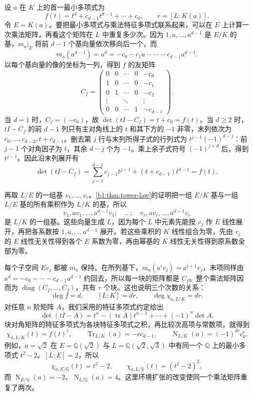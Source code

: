 设 \(a\) 在 \(K\) 上的首一最小多项式为
\[
	f(t)=t^d+c_{d-1}t^{d-1}+\cdots+c_0, \qquad r=[L:K(a)].
\]
令 \(E=K(a)\)。要把最小多项式与乘法特征多项式联系起来，可以在 \(E\) 上计算一次乘法矩阵，再看这个矩阵在 \(L\) 中重复多少次。因为 \(1,a,\ldots,a^{d-1}\) 是 \(E/K\) 的基，\(m_a|_E\) 将前 \(d-1\) 个基向量依次移向后一个，而
\[
	m_a(a^{d-1})=a^d=-c_0-c_1a-\cdots-c_{d-1}a^{d-1}.
\]
以每个基向量的像的坐标为一列，得到 \(f\) 的友矩阵
\[
	C_f=\begin{pmatrix}
		0&0&\cdots&0&-c_0\\
		1&0&\cdots&0&-c_1\\
		0&1&\cdots&0&-c_2\\
		\vdots&&\ddots&&\vdots\\
		0&0&\cdots&1&-c_{d-1}
	\end{pmatrix}.
\]
当 \(d=1\) 时，\(C_f=(-c_0)\)，故 \(\det(tI-C_f)=t+c_0=f(t)\)。当 \(d\geq2\) 时，\(tI-C_f\) 的前 \(d-1\) 列只有主对角线上的 \(t\) 和其下方的 \(-1\) 非零，末列依次为 \(c_0,\ldots,c_{d-2},t+c_{d-1}\)。删去第 \(j\) 行与末列所得子式的行列式为 \(t^{j-1}(-1)^{d-j}\)：前 \(j-1\) 个对角因子为 \(t\)，其余 \(d-j\) 个为 \(-1\)。乘上余子式符号 \((-1)^{j+d}\) 后，得到 \(t^{j-1}\)。因此沿末列展开有
\[
	\det(tI-C_f) =\sum_{j=1}^{d-1}c_{j-1}t^{j-1} +(t+c_{d-1})t^{d-1}=f(t).
\]

\ProseParagraphBreak

再取 \(L/E\) 的一组基 \(v_1,\ldots,v_r\)。\cref{b1:thm:tower-law}的证明把一组 \(E/K\) 基与一组 \(L/E\) 基的所有乘积作为 \(L/K\) 的基，所以
\[
	v_1,av_1,\ldots,a^{d-1}v_1;\quad\ldots;\quad v_r,av_r,\ldots,a^{d-1}v_r
\]
是 \(L/K\) 的一组基。这些向量生成 \(L\)，因为每个 \(L\) 中元素先能按 \(v_j\) 作 \(E\) 线性展开，再把各系数按 \(1,a,\ldots,a^{d-1}\) 展开。若这些乘积的 \(K\) 线性组合为零，先由 \(v_j\) 的 \(E\) 线性无关性得到各个 \(E\) 系数为零，再由幂基的 \(K\) 线性无关性得到原系数全部为零。

\ProseParagraphBreak

每个子空间 \(Ev_j\) 都被 \(m_a\) 保持。在所列基下，\(m_a(a^iv_j)=a^{i+1}v_j\)，末项同样由 \(a^d=-c_0-\cdots-c_{d-1}a^{d-1}\) 约回去，所以每一块的矩阵都是 \(C_f\)。整个乘法矩阵因而为 \(\operatorname{diag}(C_f,\ldots,C_f)\)，共有 \(r\) 个块。这也说明三个次数的关系：
\[
	\deg f=d,\qquad [L:K]=dr,\qquad \deg\chi_{a,L/K}=dr.
\]
对任意 \(n\) 阶矩阵 \(A\)，我们采用的特征多项式约定给出
\[
	\det(tI-A)=t^n-(\operatorname{tr}A)t^{n-1}+\cdots+(-1)^n\det A.
\]
块对角矩阵的特征多项式为各块特征多项式之积，再比较次高项与常数项，就得到
\begin{equation}\label{b1:eq:trace-norm-minimal-polynomial}
	\chi_{a,L/K}(t)=f(t)^r,\qquad \operatorname{Tr}_{L/K}(a)=-r c_{d-1},\qquad \operatorname{N}_{L/K}(a)=(-1)^{dr}c_0^r.
\end{equation}
例如，\(a=\sqrt2\) 在 \(E=\mathbb Q(\sqrt2)\) 与 \(L=\mathbb Q(\sqrt2,\sqrt3)\) 中有同一个 \(\mathbb Q\) 上的最小多项式 \(t^2-2\)。\([L:E]=2\)，所以
\[
	\chi_{a,E/\mathbb Q}(t)=t^2-2,\qquad \chi_{a,L/\mathbb Q}(t)=(t^2-2)^2,
\]
而 \(\operatorname{N}_{E/\mathbb Q}(a)=-2\)、\(\operatorname{N}_{L/\mathbb Q}(a)=4\)。这里环境扩张的改变使同一个乘法矩阵重复了两次。

